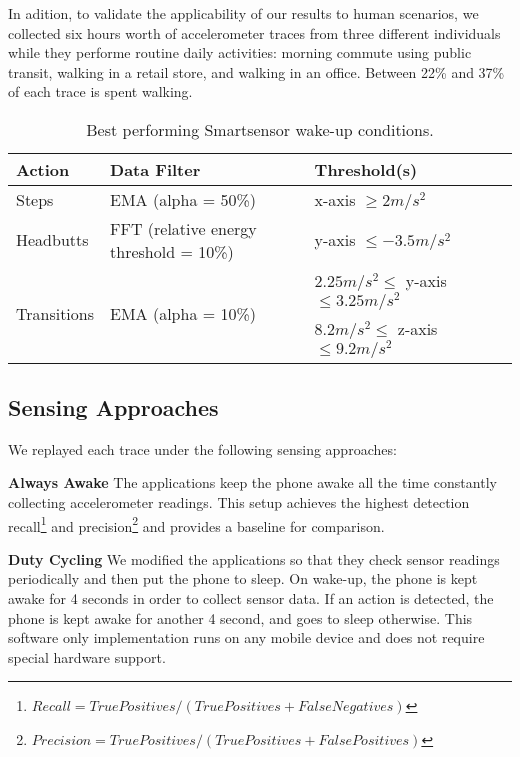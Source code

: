 In adition, to validate the applicability of our results to human
scenarios, we collected six hours worth of accelerometer traces from
three different individuals while they performe routine daily
activities: morning commute using public transit, walking in a retail
store, and walking in an office.  Between 22\% and 37\% of each trace
is spent walking.



\begin{table*}[t]
\centering
    \begin{tabular}{|l|l|l|l|}
	\hline
    Action      					& Data Filter 									& Threshold(s) \\ \hline
    Steps     					& EMA (alpha = 50\%) 						& x-axis $\geq 2 m/s^2$ 		\\ \hline
	Headbutts   					& FFT (relative energy threshold = 10\%) 	& y-axis $\leq -3.5 m/s^2$ 		\\ \hline
	\multirow{2}{*}{Transitions} 	& \multirow{2}{*}{EMA (alpha = 10\%)}		& $2.25 m/s^2 \leq$ y-axis $\leq 3.25 m/s^2$ 	\\ 
									&												& $8.2 m/s^2 \leq$ z-axis $\leq 9.2 m/s^2$ 	\\ \hline
    \end{tabular}
	\caption{Best performing Smartsensor wake-up conditions.}
	\label{table:WUCparameters}
\end{table*}


\subsection{Sensing Approaches}

We replayed each trace under the following sensing approaches:

\textbf{Always Awake} The applications keep the phone awake all the
time constantly collecting accelerometer readings.  This setup
achieves the highest detection
recall\footnote{$Recall=TruePositives/(TruePositives+FalseNegatives)$}
and
precision\footnote{$Precision=TruePositives/(TruePositives+FalsePositives)$}
and provides a baseline for comparison.

\textbf{Duty Cycling} We modified the applications so that they check
sensor readings periodically and then put the phone to sleep.  On
wake-up, the phone is kept awake for 4 seconds in order to collect
sensor data.  If an action is detected, the phone is kept awake for
another 4 second, and goes to sleep otherwise.  This software only
implementation runs on any mobile device and does not require special
hardware support.

